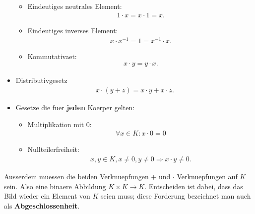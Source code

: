\documentclass[12pt]{article}
\begin{document}
\begin{flushleft}
\begin{itemize}
\begin{itemize}
\begin{align*}
            \end{align*}
            \item Eindeutiges neutrales Element: \begin{align*}
                1 \cdot x = x \cdot 1 = x.
            \end{align*}
            \item Eindeutiges inverses Element: \begin{align*}
                x \cdot x^{-1} = 1 = x^{-1} \cdot x.
            \end{align*}
            \item Kommutativaet: \begin{align*}
                x \cdot y = y \cdot x.
            \end{align*}
        \end{itemize}
        \item Distributivgesetz
        \begin{align*}
            x \cdot (y + z) = x \cdot y + x \cdot z.
        \end{align*}
        \item Gesetze die fuer \textbf{jeden} Koerper gelten:
        \begin{itemize}
            \item Multiplikation mit 0: \begin{align*}
                \forall x \in K: x \cdot 0 = 0
            \end{align*}
            \item Nullteilerfreiheit: \begin{align*}
                x,y \in K, x \not = 0, y \not = 0 \Rightarrow x \cdot y \not = 0.
            \end{align*}
        \end{itemize}
    \end{itemize}
    Ausserdem muessen die beiden Verknuepfungen $+$ und $\cdot$ Verknuepfungen auf $K$ sein. Also eine binaere Abbildung $K \times K \rightarrow K$.
    Entscheiden ist dabei, dass das Bild wieder ein Element von $K$ seien muss; diese Forderung bezeichnet man auch als \textbf{Abgeschlossenheit}.
\end{flushleft}
\end{document}
